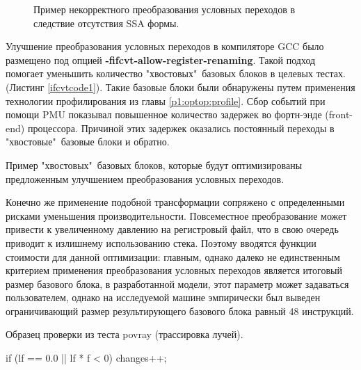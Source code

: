 \begin{figure}[htbp]
	\centering

	
	\caption{Пример некорректного преобразования условных переходов в следствие отсутствия SSA формы.}
	\label{fig:ifcvtsvg1}
\end{figure}

Улучшение преобразования условных переходов в компиляторе GCC было размещено под опцией \mbox{\textbf{-fifcvt-allow-register-renaming}}. Такой подход помогает уменьшить количество "хвостовых"\   базовых блоков в целевых тестах. (Листинг \ref{ifcvtcode1}). Такие базовые блоки были обнаружены путем применения технологии профилирования из главы \ref{p1:optop:profile}. Сбор событий при помощи PMU показывал повышенное количество задержек во фортн-энде (front-end) процессора. Причиной этих задержек оказались постоянный переходы в "хвостовые"\   базовые блоки и обратно.


\begin{ListingEnv}[!h]
	\captiondelim{ } %
		\caption{Пример "хвостовых"\  базовых блоков, которые будут оптимизированы предложенным улучшением преобразования условных переходов.}
	\label{ifcvtcode1}
\end{ListingEnv}

Конечно же применение подобной трансформации сопряжено с определенными рисками уменьшения производительности. Повсеместное преобразование может привести к увеличенному давлению на регистровый файл, что в свою очередь приводит к излишнему использованию стека. Поэтому вводятся функции стоимости для данной оптимизации: главным, однако далеко не единственным критерием применения преобразования условных переходов является итоговый размер базового блока, в  разработанной модели, этот параметр может задаваться пользователем, однако на исследуемой машине эмпирически был выведен  ограничивающий размер  результирующего базового блока равный 48 инструкций.
\begin{ListingEnv}[!h]
	\captiondelim{ } %
	\caption{Образец проверки из теста povray (трассировка лучей).}
	\label{ifcvtcode2}
	\begin{Verb}
		if (lf == 0.0 || lf * f < 0)
		{
			changes++;
		} 
	\end{Verb}
\end{ListingEnv}


